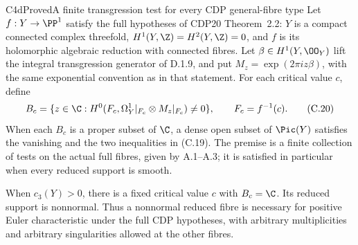 \begin{statement}{C4d}{Proved}{A finite transgression test for every CDP general-fibre type}
Let $f:Y\to\PP^1$ satisfy the full hypotheses of CDP20 Theorem~2.2: $Y$ is a compact connected complex threefold, $H^1(Y,\Z)=H^2(Y,\Z)=0$, and $f$ is its holomorphic algebraic reduction with connected fibres. Let $\beta\in H^1(Y,\OO_Y)$ lift the integral transgression generator of D.1.9, and put $M_z=\exp(2\pi i z\beta)$, with the same exponential convention as in that statement. For each critical value $c$, define
\[
 B_c=\{z\in\C:
 H^0(F_c,\Omega_Y^1|_{F_c}\otimes M_z|_{F_c})\ne0\},
 \qquad F_c=f^{-1}(c).
 \tag{C.20}
\]
When each $B_c$ is a proper subset of $\C$, a dense open subset of $\Pic(Y)$ satisfies the vanishing and the two inequalities in (C.19). The premise is a finite collection of tests on the actual full fibres, given by A.1--A.3; it is satisfied in particular when every reduced support is smooth.

When $c_3(Y)>0$, there is a fixed critical value $c$ with $B_c=\C$. Its reduced support is nonnormal. Thus a nonnormal reduced fibre is necessary for positive Euler characteristic under the full CDP hypotheses, with arbitrary multiplicities and arbitrary singularities allowed at the other fibres.
\end{statement}
